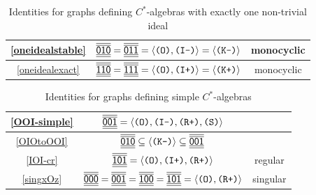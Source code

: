 \documentclass[12pt]{amsbook}%
\theoremstyle{defin}
\theoremstyle{remark}
\numberwithin{equation}{chapter}
\numberwithin{theor}{section}
\newcommand{\xyzLPArel}[1]{\mbox{$\overline{\overline{\underline{\underline{\mathsf{ #1}}}}}$}}
\newcommand{\IIIm}{\mbox{\texttt{\textup{(I-)}}}}
\newcommand{\IIIp}{\mbox{\texttt{\textup{(I+)}}}}
\newcommand{\OOO}{\mbox{\texttt{\textup{(O)}}}}
\newcommand{\RRRp}{\mbox{\texttt{\textup{(R+)}}}}
\newcommand{\KKKp}{\mbox{\texttt{\textup{(K+)}}}}
\newcommand{\KKKm}{\mbox{\texttt{\textup{(K-)}}}}
\newcommand{\SSS}{\mbox{\texttt{\textup{(S)}}}}
\begin{document}
 
 \begin{table}
  \begin{center}
 \begin{tabular}{|c|c|c|}\hline
  \ref{oneidealstable}&$\xyzLPArel{010}=\xyzLPArel{011}=\langle\OOO,\IIIm\rangle=\langle\KKKm\rangle$&monocyclic\\\hline 
  \ref{oneidealexact}&$\xyzLPArel{110}=\xyzLPArel{111}=\langle\OOO,\IIIp\rangle=\langle\KKKp\rangle$&monocyclic\\\hline   
                            \end{tabular}
 \end{center}
   \caption{Identities for graphs defining $C^*$-algebras  with exactly one non-trivial ideal}\label{LPAone}
 \end{table}
 
 \begin{table}
  \begin{center}
 \begin{tabular}{|c|c|c|}\hline
  \ref{OOI-simple}&$\xyzLPArel{001}=\langle \OOO,\IIIm,\RRRp,\SSS\rangle$&\\\hline
  \ref{OIOtoOOI}&$\xyzLPArel{010}\subseteq\langle\KKKm\rangle\subseteq\xyzLPArel{001}$&\\\hline

  \ref{IOI-cr}&$\xyzLPArel{101}=\langle\OOO,\IIIp,\RRRp\rangle$&regular\\\hline  

  \ref{singxOz}&$\xyzLPArel{000}=\xyzLPArel{001}=\xyzLPArel{100}=\xyzLPArel{101}=\langle\OOO,\RRRp\rangle$&singular\\\hline  
                             \end{tabular}
 \end{center}
  \caption{Identities for graphs defining simple $C^*$-algebras}\label{LPAnone}
 \end{table}
 
\end{document}
